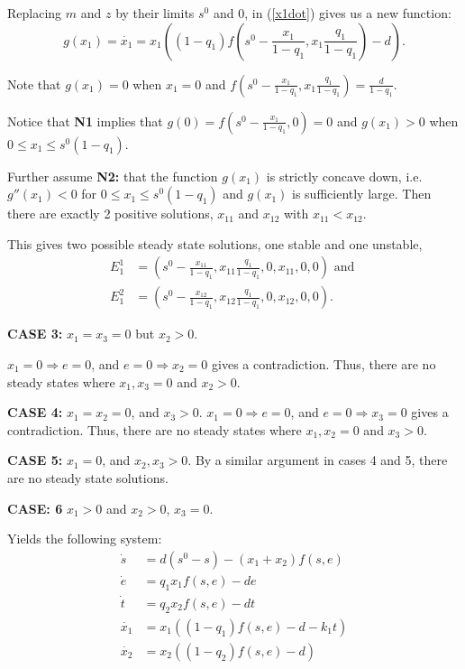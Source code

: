 \documentclass[12pt]{article}
\begin{document}
\noindent Replacing $m$ and $z$ by their limits $s^0$ and $0$, in (\ref{x1dot}) gives us a new function: $$g(x_1)=\dot{x_1}=x_1 ((1-q_1)f(s^0-\frac{x_1}{1-q_1},x_1 \frac{q_1}{1-q_1})-d).$$

\noindent Note that $g(x_1)= 0$ when $x_1=0$ and $f(s^0-\frac{x_1}{1-q_1},x_1 \frac{q_1}{1-q_1})=\frac{d}{1-q_1}$. 

\noindent Notice that \textbf{N1} implies that $g(0)=f(s^0-\frac{x_1}{1-q_1},0)=0$ and $g(x_1)>0$ when $0 \leq x_1 \leq s^0 (1-q_1)$. 

\noindent Further assume \textbf{N2:} that the function $g(x_1)$ is strictly concave down, i.e. $g''(x_1)<0$ for $0 \leq x_1 \leq s^0(1-q_1)$ and $g(x_1)$ is sufficiently large. Then there are exactly 2 positive solutions, $x_{11}$ and $x_{12}$ with $x_{11} < x_{12}$. 

\noindent This gives two possible steady state solutions, one stable and one unstable, 
\begin{align*} E_1^1&=(s^0- \frac{x_{11}}{1-q_1}, x_{11}\frac{q_1}{1-q_1},0,x_{11},0,0) \text{ and } \\
E_1^2&=(s^0- \frac{x_{12}}{1-q_1}, x_{12}\frac{q_1}{1-q_1},0,x_{12},0,0).
\end{align*}

\noindent \textbf{CASE 3: } $x_1=x_3=0$ but $x_2>0$. 

\noindent $x_1 =0 \Rightarrow e =0$, and $e=0 \Rightarrow x_2 =0$ gives a contradiction. Thus, there are no steady states where $x_1,x_3=0$ and $x_2>0$. 

\noindent \textbf{CASE 4: } $x_1=x_2=0$, and $x_3>0$. 
\noindent $x_1 =0 \Rightarrow e =0$, and $e=0 \Rightarrow x_3 =0$ gives a contradiction. Thus, there are no steady states where $x_1,x_2=0$ and $x_3>0$. 

\noindent \textbf{CASE 5: } $x_1 =0$, and $x_2, x_3 >0$. By a similar argument in cases 4 and 5, there are no steady state solutions.

\noindent \textbf{CASE: 6} $x_1 >0$ and $x_2 >0$, $x_3=0$. 

\noindent Yields the following system: 
\begin{align}
\dot{s}&=d(s^0-s)-(x_1 + x_2) f(s,e) \label{12start} \\
\dot{e}&=q_1 x_1 f(s,e)-de\\
\dot{t}&=q_2 x_2 f(s,e) - dt\\
\dot{x_1} &= x_1((1-q_1)f(s,e)-d- k_1 t)\\
\dot{x_2}&=x_2((1-q_2)f(s,e)-d)\label{12last}
\end{align}
\end{document}
